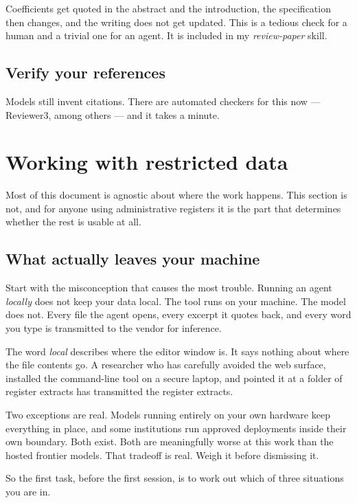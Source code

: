 \documentclass[11pt,a4paper]{article}
\begin{document}
Coefficients get quoted in the abstract and the introduction, the specification
then changes, and the writing does not get updated. This is a tedious check for a
human and a trivial one for an agent. It is included in my \emph{review-paper}
skill.

\subsection{Verify your references}

Models still invent citations. There are automated checkers for this now
--- Reviewer3, among others --- and it takes a minute.

\section{Working with restricted data}
\label{sec:confidential}

Most of this document is agnostic about where the work happens. This section is
not, and for anyone using administrative registers it is the part that determines
whether the rest is usable at all.

\subsection{What actually leaves your machine}

Start with the misconception that causes the most trouble. Running an agent
\emph{locally} does not keep your data local. The tool runs on your machine. The
model does not. Every file the agent opens, every excerpt it quotes back, and
every word you type is transmitted to the vendor for inference.

The word \emph{local} describes where the editor window is. It says nothing about
where the file contents go. A researcher who has carefully avoided the web
surface, installed the command-line tool on a secure laptop, and pointed it at a
folder of register extracts has transmitted the register extracts.

Two exceptions are real. Models running entirely on your own hardware keep
everything in place, and some institutions run approved deployments inside their
own boundary. Both exist. Both are meaningfully worse at this work than the
hosted frontier models. That tradeoff is real. Weigh it before dismissing it.

So the first task, before the first session, is to work out which of three
situations you are in.
\end{document}
